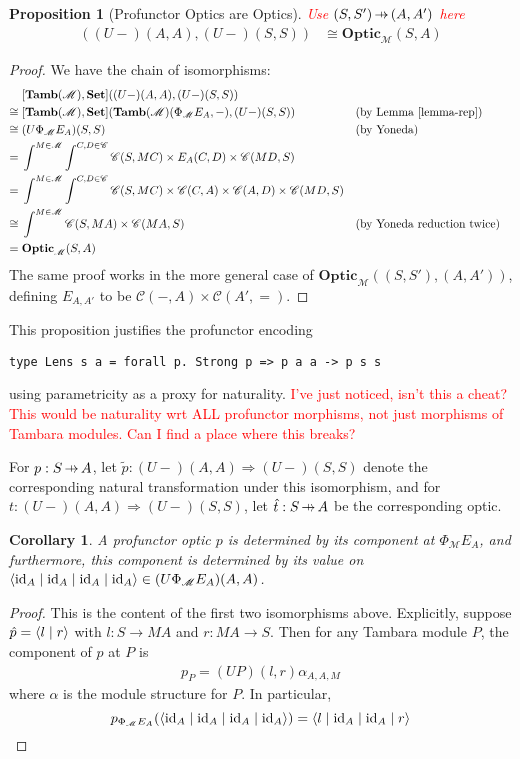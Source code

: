 \documentclass[11pt,letterpaper]{article}
\theoremstyle{plain}
\newtheorem{proposition}[theorem]{Proposition}
\newtheorem{corollary}[theorem]{Corollary}
\theoremstyle{definition}
\newcommand{\C}{\mathscr{C}}
\newcommand{\M}{\mathscr{M}}
\newcommand{\Pastro}{\Phi}
\newcommand{\Set}{\mathbf{Set}}
\newcommand{\Tamb}{\mathbf{Tamb}}
\newcommand{\Optic}{\mathbf{Optic}}
\newcommand{\id}{\mathrm{id}}
\newcommand{\rep}[2]{{\ensuremath \left\langle #1 \mid #2 \right\rangle}}
\newcommand{\repfour}[4]{{\ensuremath \langle #1 \mid #2 \mid #3 \mid #4 \rangle}}
\newcommand{\hto}{\ensuremath{\,\mathaccent\shortmid\rightarrow\,}}
\newcommand{\todo}[1]{\textcolor{red}{\small #1}}
\begin{document}
\begin{proposition}[Profunctor Optics are Optics]\label{prop:profunctor-optics-are-optics}
\todo{Use $(S, S') \hto (A, A')$ here}
  \begin{align*}
    [\Tamb(\M), \Set]((U-)(A,A),(U-)(S,S)) &\cong \Optic_\M(S, A)
  \end{align*}
\end{proposition}
\begin{proof}
  We have the chain of isomorphisms:
  \begin{align*}
    &[\Tamb(\M), \Set]((U-)(A,A),(U-)(S,S)) \\
    \cong \;&[\Tamb(\M), \Set](\Tamb(\M)(\Pastro_\M E_A, -), (U-)(S,S))  && \text{(by Lemma~\ref{lemma-rep})}\\
    \cong \;&(U\Pastro_\M E_A)(S,S)  && \text{(by Yoneda)} \\
    = \;&\int^{M \in \M} \int^{C,D \in \C} \C(S, MC) \times E_A(C,D) \times \C(MD,S) \\
    = \;&\int^{M \in \M} \int^{C,D \in \C} \C(S, MC) \times \C(C,A) \times \C(A,D) \times \C(MD,S) \\
    \cong \;&\int^{M \in \M} \C(S, MA) \times \C(MA, S)  && \text{(by Yoneda reduction twice)} \\
    = \;&\Optic_\M(S, A)
  \end{align*}
  The same proof works in the more general case of $\Optic_\M((S, S'), (A,A'))$, defining $E_{A, A'}$ to be $\C(-, A) \times \C(A', {=})$.
\end{proof}

  This proposition justifies the profunctor encoding
\begin{verbatim}
type Lens s a = forall p. Strong p => p a a -> p s s
\end{verbatim}
  using parametricity as a proxy for naturality.
  \todo{I've just noticed, isn't this a cheat? This would be naturality wrt ALL profunctor morphisms, not just morphisms of Tambara modules. Can I find a place where this breaks?} 

For $p : S \hto A$, let $\tilde{p} : (U-)(A,A) \Rightarrow (U-)(S,S)$ denote the corresponding natural transformation under this isomorphism, and for $t : (U-)(A,A) \Rightarrow (U-)(S,S)$, let $\hat{t} : S \hto A$ be the corresponding optic.

\begin{corollary}
  A profunctor optic $p$ is determined by its component at $\Pastro_\M E_A$, and furthermore, this component is determined by its value on $\repfour{\id_A}{\id_A}{\id_A}{\id_A} \in (U \Pastro_\M E_A)(A, A)$.
\end{corollary}
\begin{proof}
  This is the content of the first two isomorphisms above. Explicitly, suppose $\hat{p} = \rep{l}{r}$ with $l : S \to MA$ and $r : MA \to S$. Then for any Tambara module $P$, the component of $p$ at $P$ is
  \begin{align*}
    p_P = (UP)(l,r) \alpha_{A,A,M}
  \end{align*}
  where $\alpha$ is the module structure for $P$. In particular,
  \[
    p_{\Pastro_\M E_A}(\repfour{\id_A}{\id_A}{\id_A}{\id_A}) = \repfour{l}{\id_A}{\id_A}{r}
  \]
\end{proof}
\end{document}
